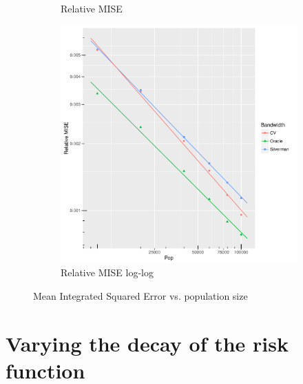 \begin{figure}[htbp]
\begin{subfigure}[b]{0.3\textwidth}
    \caption{Relative MISE}
    \end{subfigure}
    \begin{subfigure}[b]{0.3\textwidth}
    \includegraphics[width=\textwidth]{results/by_pop_size/RMISE-vs-population-log-log}
    \caption{Relative MISE log-log}
    \end{subfigure}
    \caption[MISE: by population size]{Mean Integrated Squared Error vs. population size}
    \label{fig:ise:unifNpop_1h}
\end{figure}




\section{Varying the decay of the risk function}
\label{sec:results:unif_100_SD}

